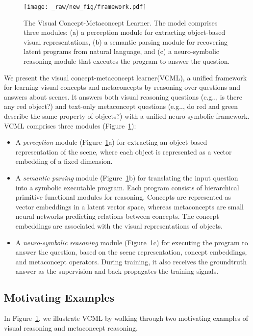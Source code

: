 \documentclass{article}
\makeatletter
\newcommand{\fig}[1]{Figure~\ref{#1}}
\DeclareRobustCommand\onedot{\futurelet\@let@token\@onedot}
\def\@onedot{\ifx\@let@token.\else.\null\fi\xspace}
\def\eg{e.g\onedot} \def\Eg{E.g\onedot}
\newcommand{\modelfull}{visual concept-metaconcept learner\xspace}
\newcommand{\model}{VCML\xspace}
\makeatother
\begin{document}
\begin{figure}
    \centering
    \texttt{[image: \_raw/new\_fig/framework.pdf]}
    \caption{The Visual Concept-Metaconcept Learner. The model comprises three modules: (a) a perception module for extracting object-based visual representations, (b) a semantic parsing module for recovering latent programs from natural language, and (c) a neuro-symbolic reasoning module that executes the program to answer the question.}
    \label{fig:framework}
    \vspace{-1em}
\end{figure} 
We present the \modelfull (\model), a unified framework for learning visual concepts and metaconcepts by reasoning over questions and answers about scenes. It answers both visual reasoning questions (\eg, is there any red object?) and text-only metaconcept questions (\eg, do red and green describe the same property of objects?) with a unified neuro-symbolic framework. \model comprises three modules (\fig{fig:framework}):

\begin{itemize}[leftmargin=*]
    \item A {\it perception} module (\fig{fig:framework}a) for extracting an object-based representation of the scene, where each object is represented as a vector embedding of a fixed dimension.
    \item A {\it semantic parsing} module (\fig{fig:framework}b) for translating the input question into a symbolic executable program. Each program consists of hierarchical primitive functional modules for reasoning. Concepts are represented as vector embeddings in a latent vector space, whereas metaconcepts are small neural networks predicting relations between concepts. The concept embeddings are associated with the visual representations of objects.
    \item A {\it neuro-symbolic reasoning} module (\fig{fig:framework}c) for executing the program to answer the question, based on the scene representation, concept embeddings, and metaconcept operators. During training, it also receives the groundtruth answer as the supervision and back-propagates the training signals.
\end{itemize} 


\subsection{Motivating Examples}
In \fig{fig:framework}, we illustrate \model by walking through two motivating examples of visual reasoning and metaconcept reasoning.
\end{document}

